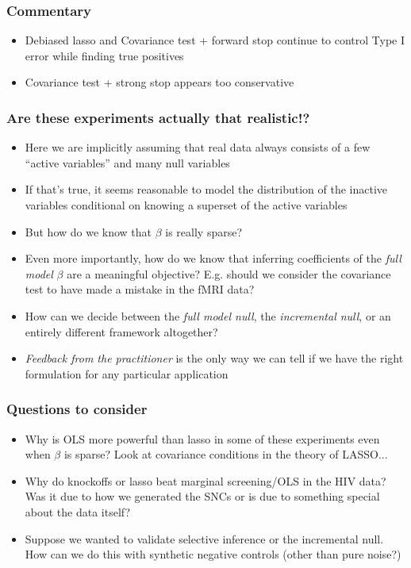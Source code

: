 \documentclass{beamer}
\begin{document}
\begin{frame}
\frametitle{Commentary}
\begin{itemize}
\item Debiased lasso and Covariance test + forward stop continue to control Type I error while finding true positives
\item Covariance test + strong stop appears too conservative
\end{itemize}
\end{frame}


\begin{frame}
\frametitle{Are these experiments actually that realistic!?}
\begin{itemize}
\item<1-> Here we are implicitly assuming that real data always consists of a few ``active variables'' and many null variables
\item<1-> If that's true, it seems reasonable to model the distribution of the inactive variables conditional on knowing a superset of the active variables
\item<2-> But how do we know that $\beta$ is really sparse?
\item<2-> Even more importantly, how do we know that inferring coefficients of the
  \emph{full model} $\beta$ are a meaningful objective?  E.g. should we consider the
  covariance test to have made a mistake in the fMRI data?
\item<3-> How can we decide between the \emph{full model null}, the
  \emph{incremental null}, or an entirely different framework
  altogether?
\item<3-> \emph{Feedback from the practitioner} is the only way we can
  tell if we have the right formulation for any particular application
\end{itemize}
\end{frame}

\begin{frame}
\frametitle{Questions to consider}
\begin{itemize}
\item Why is OLS more powerful than lasso in some of these experiments even when $\beta$ is sparse? Look at covariance conditions in the theory of LASSO...
\item Why do knockoffs or lasso beat marginal screening/OLS in the HIV data? Was it due to how we generated the SNCs or is due to something special about the data itself?
\item Suppose we wanted to validate selective inference or the incremental null.  How can we do this with synthetic negative controls (other than pure noise?)
\end{itemize}
\end{frame}
\end{document}
